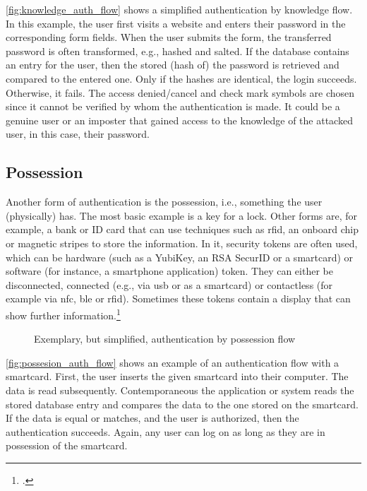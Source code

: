 \autoref{fig:knowledge_auth_flow} shows a simplified authentication by knowledge flow. In this example, the user first visits a website and enters their password in the corresponding form fields. When the user submits the form, the transferred password is often transformed, e.g., hashed and salted. If the database contains an entry for the user, then the stored (hash of) the password is retrieved and compared to the entered one. Only if the hashes are identical, the login succeeds. Otherwise, it fails. The \frqq access denied/cancel\flqq{} and \frqq check mark\flqq{} symbols are chosen since it cannot be verified by whom the authentication is made. It could be a genuine user or an imposter that gained access to the knowledge of the attacked user, in this case, their password.

\subsection{Possession}

Another form of authentication is the possession, i.e., \frqq something the user (physically) has\flqq{}. The most basic example is a key for a lock. Other forms are, for example, a bank or ID card that can use techniques such as \gls{rfid}, an onboard chip or magnetic stripes to store the information. In \gls{it}, security tokens are often used, which can be hardware (such as a YubiKey, an RSA SecurID or a smartcard) or software (for instance, a smartphone application) token. They can either be disconnected, connected (e.g., via \gls{usb} or as a smartcard) or contactless (for example via \gls{nfc}, \gls{ble} or \gls{rfid}). Sometimes these tokens contain a display that can show further information.\footcites[See][24]{265831}[See][]{Dressel:2019:SZT:3319499.3328225}[See][8--11]{1698485}

\begin{figure}[hbt]
	\centering
	
	\caption[Exemplary, but simplified, authentication by possession flow]{Exemplary, but simplified, authentication by possession flow\footnotemark}
	\label{fig:possesion_auth_flow}
\end{figure}

\autoref{fig:possesion_auth_flow} shows an example of an authentication flow with a smartcard. First, the user inserts the given smartcard into their computer. The data is read subsequently. Contemporaneous the application or system reads the stored database entry and compares the data to the one stored on the smartcard. If the data is equal or matches, and the user is authorized, then the authentication succeeds. Again, any user can log on as long as they are in possession of the smartcard.

